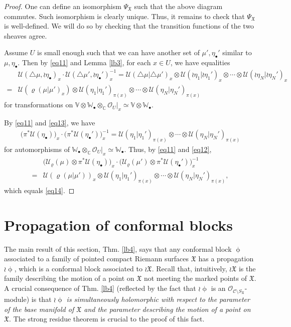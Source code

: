 \documentclass[12pt,a4paper,notitlepage]{article}
\theoremstyle{definition}
\theoremstyle{plain}
\newcommand{\fk}{\mathfrak}
\newcommand{\mc}{\mathcal}
\newcommand{\scr}{\mathscr}
\newcommand{\SX}{{S_{\fk X}}}
\newcommand{\blt}{\bullet}
\newcommand{\Vbb}{\mathbb V}
\newcommand{\Wbb}{\mathbb W}
\newcommand{\Cbb}{\mathbb C}
\numberwithin{equation}{section}
\begin{document}
\begin{proof}
One can define an isomorphism $\Psi_{\fk X}$ such that the above diagram commutes. Such isomorphism is clearly unique. Thus, it remains to check that $\Psi_{\fk X}$ is well-defined. We will do so by checking that the transition functions of the two sheaves agree.

Assume $U$ is small enough such that we can have another set of $\mu',\eta_\blt'$ similar to $\mu,\eta_\blt$. Then by \eqref{eq11} and Lemma \ref{lb3}, for each $x\in U$, we have equalities
\begin{align}
&\mc U(\triangle\mu,\wr\eta_\blt)_x\cdot \mc U(\triangle\mu',\wr\eta_\blt')_x^{-1}=\mc U(\triangle\mu|\triangle\mu')_x\otimes\mc U(\wr\eta_1|\wr\eta_1')_x\otimes\cdots\otimes \mc U(\wr\eta_N|\wr\eta_N')_x \nonumber \\
=&\mc U(\varrho(\mu|\mu')_x)\otimes \mc U(\eta_1|\eta_1')_{\pi(x)}\otimes\cdots\otimes \mc U(\eta_N|\eta_N')_{\pi(x)}\label{eq14}
\end{align}
for transformations on $\Vbb\otimes\Wbb_\blt\otimes_\Cbb\scr O_U|_x\simeq \Vbb\otimes\Wbb_\blt$. 

By \eqref{eq11} and \eqref{eq13},  we have 
\begin{align}
	\big(\pi^*\mc U(\eta_\blt)\big)_x\cdot \big(\pi^*\mc U(\eta_\blt')\big)^{-1}_x=\mc U(\eta_1|\eta_1')_{\pi(x)}\otimes\cdots\otimes \mc U(\eta_N|\eta_N')_{\pi(x)}	
\end{align}
for automorphisms of $\Wbb_\blt\otimes_\Cbb\scr O_U|_x\simeq\Wbb_\blt$. Thus, by \eqref{eq11} and \eqref{eq12},
\begin{align*}
&\big(\mc U_\varrho(\mu)\otimes\pi^*\mc U(\eta_\blt) \big)_x\cdot\big(\mc U_\varrho(\mu')\otimes\pi^*\mc U(\eta_\blt')\big)_x^{-1}\\
=&	\mc U(\varrho(\mu|\mu'))_x\otimes \mc U(\eta_1|\eta_1')_{\pi(x)}\otimes\cdots\otimes \mc U(\eta_N|\eta_N')_{\pi(x)},
\end{align*}
which equals \eqref{eq14}.
\end{proof}









\section{Propagation of conformal blocks}\label{lb22}

The main result of this section, Thm. \ref{lb4}, says that any conformal block $\upphi$ associated to a family of pointed compact Riemann surfaces $\fk X$ has a propagation $\wr\upphi$, which is a conformal block associated to $\wr\fk X$. Recall that, intuitively, $\wr\fk X$ is the family describing the motion of a point on $\fk X$
not meeting the marked points of $\fk X$. A crucial consequence of Thm. \ref{lb4} (reflected by the fact that $\wr\upphi$ is an $\scr O_{\mc C\setminus \SX}$-module) is that $\wr\upphi$ \emph{is simultaneously holomorphic with respect to the  parameter of the base manifold of $\fk X$ and the parameter describing the motion of a point on $\fk X$}. The strong residue theorem is crucial to the proof of this fact.
\end{document}
